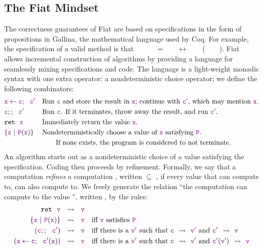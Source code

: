   \subsection{The Fiat Mindset}
    The correctness guarantees of Fiat are based on specifications in the form of propositions in Gallina, the mathematical language used by Coq.  For example, the specification of a valid  method is that ~~~~~~=~~\true~~\allowbreak$\longleftrightarrow$\allowbreak~~~~(~~~~).  Fiat allows incremental construction of algorithms by providing a language for seamlessly mixing specifications and code.  The language is a light-weight monadic syntax with one extra operator: a nondeterministic choice operator; we define the following combinators:
    \begin{align*}
      &\textcolor{violet}{\texttt{x}} \leftarrow \textcolor{violet}{\texttt{c}};~~\textcolor{violet}{\texttt{c$'$}} && \text{Run \textcolor{violet}{\texttt{c}} and store the result in \textcolor{violet}{\texttt{x}}; continue with \textcolor{violet}{\texttt{c$'$}}, which may mention \textcolor{violet}{\texttt{x}}.} \\
      &\textcolor{violet}{\texttt{c}};;~~\textcolor{violet}{\texttt{c$'$}}&&\text{Run \textcolor{violet}{\texttt{c}}.  If it terminates, throw away the result, and run \textcolor{violet}{\texttt{c$'$}}.} \\
      &\texttt{ret}~~\textcolor{violet}{\texttt{x}} && \text{Immediately return the value \textcolor{violet}{\texttt{x}}.} \\
      &\{ \textcolor{violet}{\texttt{x}}~|~\textcolor{violet}{\texttt{P}}(\textcolor{violet}{\texttt{x}}) \}&&\text{Nondeterministically choose a value of \textcolor{violet}{\texttt{x}} satisfying \textcolor{violet}{\texttt{P}}.} \\
      &&&\qquad\text{If none exists, the program is considered to not terminate.}
    \end{align*}
    An algorithm starts out as a nondeterministic choice of a value satisfying the specification.  Coding then proceeds by refinement.  Formally, we say that a computation  \emph{refines} a computation , written  $\subseteq$ , if every value that  can compute to,  can also compute to.  We freely generate the relation ``the computation  can compute to the value '', written , by the rules:
    \begin{align*}
      \texttt{ret}~~\textcolor{violet}{\texttt{v}}&~~\rightsquigarrow~~\textcolor{violet}{\texttt{v}} \\
      \{\textcolor{violet}{\texttt{x}}~|~\textcolor{violet}{\texttt{P}}(\textcolor{violet}{\texttt{x}})\}&~~\rightsquigarrow~~\textcolor{violet}{\texttt{v}}\quad\text{iff \textcolor{violet}{\texttt{v}} satisfies \textcolor{violet}{\texttt{P}}} \\
      (\textcolor{violet}{\texttt{c}};;~~\textcolor{violet}{\texttt{c$'$}})&~~\rightsquigarrow~~\textcolor{violet}{\texttt{v}}\quad\text{iff there is a \textcolor{violet}{\texttt{v$'$}} such that \textcolor{violet}{\texttt{c}}~~\ensuremath{\rightsquigarrow}~~\textcolor{violet}{\texttt{v$'$}} and \textcolor{violet}{\texttt{c$'$}}~~\ensuremath{\rightsquigarrow}~~\textcolor{violet}{\texttt{v}}} \\
      (\textcolor{violet}{\texttt{x}} \leftarrow \textcolor{violet}{\texttt{c}};~~\textcolor{violet}{\texttt{c$'$}}(\textcolor{violet}{\texttt{x}}))&~~\rightsquigarrow~~\textcolor{violet}{\texttt{v}}\quad\text{iff there is a \textcolor{violet}{\texttt{v$'$}} such that \textcolor{violet}{\texttt{c}}~~\ensuremath{\rightsquigarrow}~~\textcolor{violet}{\texttt{v$'$}} and \textcolor{violet}{\texttt{c$'$}}(\textcolor{violet}{\texttt{v$'$}})~~\ensuremath{\rightsquigarrow}~~\textcolor{violet}{\texttt{v}}}
    \end{align*}
    
